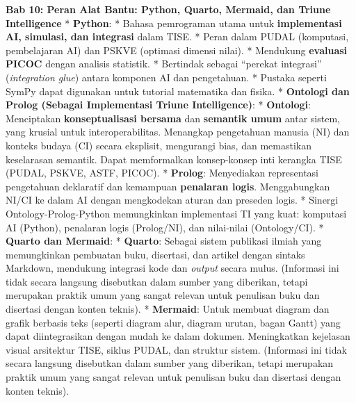 \documentclass[
  letterpaper,
  DIV=11,
  numbers=noendperiod]{scrreprt}
\begin{document}
\textbf{Bab 10: Peran Alat Bantu: Python, Quarto, Mermaid, dan Triune
Intelligence} * \textbf{Python}: * Bahasa pemrograman utama untuk
\textbf{implementasi AI, simulasi, dan integrasi} dalam TISE. * Peran
dalam PUDAL (komputasi, pembelajaran AI) dan PSKVE (optimasi dimensi
nilai). * Mendukung \textbf{evaluasi PICOC} dengan analisis statistik. *
Bertindak sebagai ``perekat integrasi'' (\emph{integration glue}) antara
komponen AI dan pengetahuan. * Pustaka seperti SymPy dapat digunakan
untuk tutorial matematika dan fisika. * \textbf{Ontologi dan Prolog
(Sebagai Implementasi Triune Intelligence)}: * \textbf{Ontologi}:
Menciptakan \textbf{konseptualisasi bersama} dan \textbf{semantik umum}
antar sistem, yang krusial untuk interoperabilitas. Menangkap
pengetahuan manusia (NI) dan konteks budaya (CI) secara eksplisit,
mengurangi bias, dan memastikan keselarasan semantik. Dapat memformalkan
konsep-konsep inti kerangka TISE (PUDAL, PSKVE, ASTF, PICOC). *
\textbf{Prolog}: Menyediakan representasi pengetahuan deklaratif dan
kemampuan \textbf{penalaran logis}. Menggabungkan NI/CI ke dalam AI
dengan mengkodekan aturan dan preseden logis. * Sinergi
Ontology-Prolog-Python memungkinkan implementasi TI yang kuat: komputasi
AI (Python), penalaran logis (Prolog/NI), dan nilai-nilai (Ontology/CI).
* \textbf{Quarto dan Mermaid}: * \textbf{Quarto}: Sebagai sistem
publikasi ilmiah yang memungkinkan pembuatan buku, disertasi, dan
artikel dengan sintaks Markdown, mendukung integrasi kode dan
\emph{output} secara mulus. (Informasi ini tidak secara langsung
disebutkan dalam sumber yang diberikan, tetapi merupakan praktik umum
yang sangat relevan untuk penulisan buku dan disertasi dengan konten
teknis). * \textbf{Mermaid}: Untuk membuat diagram dan grafik berbasis
teks (seperti diagram alur, diagram urutan, bagan Gantt) yang dapat
diintegrasikan dengan mudah ke dalam dokumen. Meningkatkan kejelasan
visual arsitektur TISE, siklus PUDAL, dan struktur sistem. (Informasi
ini tidak secara langsung disebutkan dalam sumber yang diberikan, tetapi
merupakan praktik umum yang sangat relevan untuk penulisan buku dan
disertasi dengan konten teknis).
\end{document}
